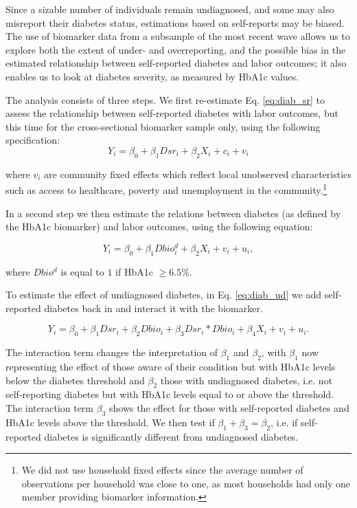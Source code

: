 \documentclass[12pt,english]{article}
\begin{document}
Since a sizable number of individuals remain undiagnosed, and some may also misreport their diabetes status, estimations based on self-reports may be biased. The use of biomarker data from a subsample of the most recent wave allows us to explore both the extent of under- and overreporting, and the possible bias in the estimated relationship between self-reported diabetes and labor outcomes; it also enables us to look at diabetes severity, as measured by \ac{HbA1c} values. 

The analysis consists of three steps. We first re-estimate Eq. \ref{eq:diab_sr} to assess the relationship between self-reported diabetes with labor outcomes, but this time for the cross-sectional biomarker sample only, using the following specification:
\begin{equation}
Y_{i}=\beta_{0}+\beta_{1}Dsr_{i}+\beta_{2}X_{i}+c_{i}+v_{i}\label{eq:diab_sr}
\end{equation}

where $v_{i}$ are community fixed effects which reflect local unobserved characteristics such as access to healthcare, poverty and unemployment in the community.\footnote{We did not use household fixed effects since the average number of observations per household was close to one, as most households had only one member providing biomarker information.}

In a second step we then estimate the relations between diabetes (as defined by the \ac{HbA1c} biomarker) and labor outcomes, using the following equation:

\begin{equation}
Y_{i}=\beta_{0}+\beta_{1}Dbio^{d}_{i}+\beta_{2}X_{i}+v_{i}+u_{i}\label{eq:diab},
\end{equation}

where $Dbio^{d}$ is equal to $1$ if \ac{HbA1c} $\geq6.5\%$. 

To estimate the effect of undiagnosed diabetes, in Eq. \ref{eq:diab_ud} we add self-reported diabetes back in and interact it with the biomarker.

\begin{equation}
Y_{i}=\beta_{0}+\beta_{1}Dsr_{i}+\beta_{2}Dbio_{i}+\beta_{3}Dsr_{i}*Dbio_{i}+\beta_{4}X_{i}+v_{i}+u_{i}.\label{eq:diab_ud}
\end{equation}

The interaction term changes the interpretation of $\beta_{1}$ and $\beta_{2}$, with $\beta_{1}$ now representing the effect of those aware of their condition but with \ac{HbA1c} levels below the diabetes threshold and $\beta_{2}$ those with undiagnosed diabetes, i.e. not self-reporting diabetes but with \ac{HbA1c} levels equal to or above the threshold. The interaction term $\beta_{3}$ shows the effect for those with self-reported diabetes and \ac{HbA1c} levels above the threshold. We then test if $\beta_{1} + \beta_{3} = \beta_{2}$, i.e. if self-reported diabetes is significantly different from undiagnosed diabetes.
\end{document}
